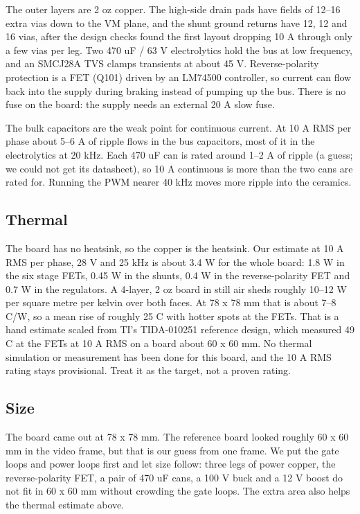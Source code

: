 The outer layers are 2 oz copper. The high-side drain pads have fields of
12--16 extra vias down to the VM plane, and the shunt ground returns have 12, 12
and 16 vias, after the design checks found the first layout dropping 10 A through
only a few vias per leg. Two 470 uF / 63 V electrolytics hold the bus at low
frequency, and an SMCJ28A TVS clamps transients at about 45 V. Reverse-polarity
protection is a FET (Q101) driven by an LM74500 controller, so current can flow
back into the supply during braking instead of pumping up the bus. There is no
fuse on the board: the supply needs an external 20 A slow fuse.

The bulk capacitors are the weak point for continuous current. At 10 A RMS per
phase about 5--6 A of ripple flows in the bus capacitors, most of it in the
electrolytics at 20 kHz. Each 470 uF can is rated around 1--2 A of ripple (a
guess; we could not get its datasheet), so 10 A continuous is more than the two
cans are rated for. Running the PWM nearer 40 kHz moves more ripple into the
ceramics.

\subsection*{Thermal}

The board has no heatsink, so the copper is the heatsink. Our estimate at 10 A
RMS per phase, 28 V and 25 kHz is about 3.4 W for the whole board: 1.8 W in the
six stage FETs, 0.45 W in the shunts, 0.4 W in the reverse-polarity FET and
0.7 W in the regulators. A 4-layer, 2 oz board in still air sheds roughly
10--12 W per square metre per kelvin over both faces. At 78 x 78 mm that is
about 7--8 C/W, so a mean rise of roughly 25 C with hotter spots at the FETs.
That is a hand estimate scaled from TI's TIDA-010251 reference design, which
measured 49 C at the FETs at 10 A RMS on a board about 60 x 60 mm. No thermal
simulation or measurement has been done for this board, and the 10 A RMS rating
stays provisional. Treat it as the target, not a proven rating.

\subsection*{Size}

The board came out at 78 x 78 mm. The reference board looked roughly 60 x 60
mm in the video frame, but that is our guess from one frame. We put the gate
loops and power loops first and let size follow: three legs of power copper, the
reverse-polarity FET, a pair of 470 uF cans, a 100 V buck and a 12 V boost do not
fit in 60 x 60 mm without crowding the gate loops. The extra area also helps the
thermal estimate above.

